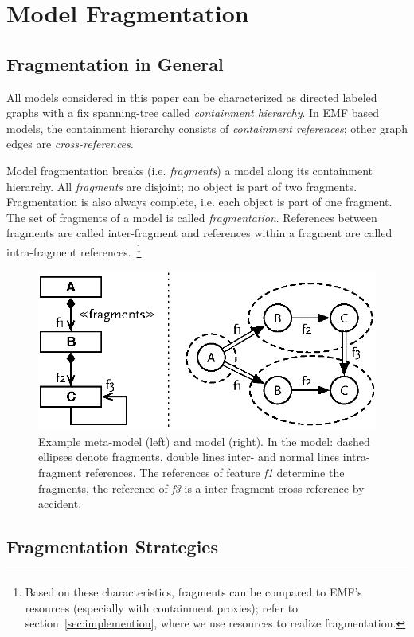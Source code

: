 \section{Model Fragmentation}
\label{sec:fragmentation}

\subsection{Fragmentation in General}
All models considered in this paper can be characterized as directed labeled graphs with a fix spanning-tree called \emph{containment hierarchy}. In EMF based models, the containment hierarchy consists of \emph{containment references}; other graph edges are \emph{cross-references}. 

Model fragmentation breaks (i.e. \emph{fragments}) a model along its containment hierarchy. All \emph{fragments} are disjoint; no object is part of two fragments. Fragmentation is also always complete, i.e. each object is part of one fragment. The set of fragments of a model is called \emph{fragmentation}. References between fragments are called inter-fragment and references within a fragment are called intra-fragment references.~\footnote{Based on these characteristics, fragments can be compared to EMF's resources (especially with containment proxies); refer to section~\ref{sec:implemention}, where we use resources to realize fragmentation.} 

\begin{figure}[ht]
\centering
\includegraphics[width=0.65\linewidth]{figures/fragmentationExplained}
\caption{Example meta-model (left) and model (right). In the model: dashed ellipses denote fragments, double lines inter- and normal lines intra-fragment references. The references of feature \emph{f1} determine the fragments, the reference of \emph{f3} is a inter-fragment cross-reference by accident.}
\label{fig:metamodelFragmentation}
\end{figure}  

\subsection{Fragmentation Strategies}

